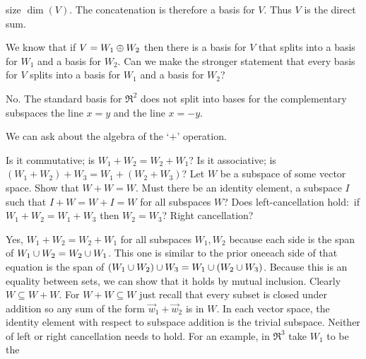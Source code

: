 \begin{exercises}
\begin{answer}
      size \( \dim(V) \).
      The concatenation is therefore a basis for \( V \).
      Thus \( V \) is the direct sum.
     \end{answer}
  \item 
    We know that if \( V=W_1\oplus W_2 \) then there is a basis for
    \( V \) that splits into a basis for \( W_1 \) and a basis for
    \( W_2 \).
    Can we make the stronger statement that every basis for \( V \) splits into
    a basis for \( W_1 \) and a basis for \( W_2 \)?
    \begin{answer}
      No.
      The standard basis for \( \Re^2 \) does not split into bases for
      the complementary subspaces the line \( x=y \) and the line 
      \( x=-y \).  
    \end{answer}
  \item 
     We can ask about the algebra of the `$+$' operation.
     \begin{exparts}
       \partsitem Is it commutative; is \( W_1+W_2=W_2+W_1 \)?
       \partsitem Is it associative; is \( (W_1+W_2)+W_3=W_1+(W_2+W_3) \)?
       \partsitem Let \( W \) be a subspace of some vector space.
         Show that \( W+W=W \).
       \partsitem Must there be an identity element,
         a subspace \( I \) such that \( I+W=W+I=W \) 
         for all subspaces \( W \)? 
       \partsitem Does left-cancellation hold:~if 
          \( W_1+W_2=W_1+W_3 \) then \( W_2=W_3 \)?
          Right cancellation?
    \end{exparts}
    \begin{answer}
      \begin{exparts}
        \partsitem  Yes, \( W_1+W_2=W_2+W_1 \) for all subspaces \( W_1,W_2 \)
          because each side is the span of \( W_1\cup W_2=W_2\cup W_1 \).
        \partsitem This one is similar to the prior one\Dash each side 
          of that equation is the span of
          \( (W_1\cup W_2)\cup W_3=W_1\cup (W_2\cup W_3) \).
        \partsitem Because this is an equality between sets, we can show that
          it holds by mutual inclusion. 
          Clearly \( W\subseteq W+W \).
          For \( W+W\subseteq W \) just recall that every subset is closed 
          under addition so any sum of the form \( \vec{w}_1+\vec{w}_2 \) is in
          \( W \).
        \partsitem In each vector space, the identity element with respect 
          to subspace addition is the trivial subspace.
        \partsitem   Neither of left or right cancellation needs to hold.
          For an example, in \( \Re^3 \) take \( W_1 \) to be the 

\end{exparts}
\end{answer}
\end{exercises}
